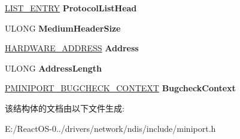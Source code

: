 \begin{DoxyCompactItemize}
\hyperlink{struct___l_i_s_t___e_n_t_r_y}{L\+I\+S\+T\+\_\+\+E\+N\+T\+RY} {\bfseries Protocol\+List\+Head}
\item 
\mbox{\label{struct___l_o_g_i_c_a_l___a_d_a_p_t_e_r_a9259eff12e0708438c3fbc5d6f6e47d0}} 
U\+L\+O\+NG {\bfseries Medium\+Header\+Size}
\item 
\mbox{\label{struct___l_o_g_i_c_a_l___a_d_a_p_t_e_r_a59201590984925cffcbf3db186389c2d}} 
\hyperlink{struct___h_a_r_d_w_a_r_e___a_d_d_r_e_s_s}{H\+A\+R\+D\+W\+A\+R\+E\+\_\+\+A\+D\+D\+R\+E\+SS} {\bfseries Address}
\item 
\mbox{\label{struct___l_o_g_i_c_a_l___a_d_a_p_t_e_r_a7ca96357bbcefb20763b149558ca6207}} 
U\+L\+O\+NG {\bfseries Address\+Length}
\item 
\mbox{\label{struct___l_o_g_i_c_a_l___a_d_a_p_t_e_r_a81a6bdbbc10020545ff92c9d8fa5be12}} 
\hyperlink{struct___m_i_n_i_p_o_r_t___b_u_g_c_h_e_c_k___c_o_n_t_e_x_t}{P\+M\+I\+N\+I\+P\+O\+R\+T\+\_\+\+B\+U\+G\+C\+H\+E\+C\+K\+\_\+\+C\+O\+N\+T\+E\+XT} {\bfseries Bugcheck\+Context}
\end{DoxyCompactItemize}


该结构体的文档由以下文件生成\+:\begin{DoxyCompactItemize}
\item 
E\+:/\+React\+O\+S-\/0../drivers/network/ndis/include/miniport.\+h\end{DoxyCompactItemize}
